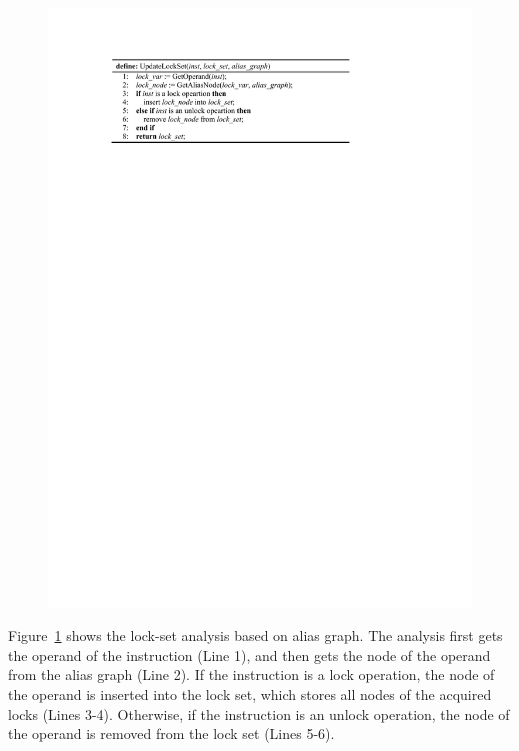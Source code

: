 \begin{figure}[htbp]
	\centering
	\includegraphics[width=1\linewidth]{figures/fig_pseudocode_lock_set.pdf}
	\label{fig_pseudocode_lock_set}
\end{figure}

Figure~\ref{fig_pseudocode_lock_set} shows the lock-set analysis based on alias 
graph. The analysis first gets the operand of the instruction (Line 1), and 
then gets the node of the operand from the alias graph (Line 2). If the 
instruction is a lock operation, the node of the operand is inserted into the 
lock set, which stores all nodes of the acquired locks (Lines 3-4). Otherwise, 
if the instruction is an unlock operation, the node of the operand is removed 
from the lock set (Lines 5-6).

